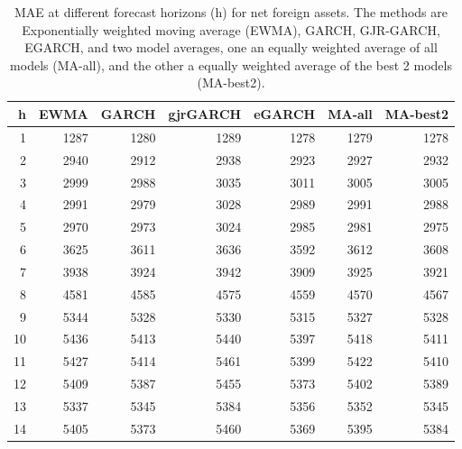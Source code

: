 \begin{table}[ht]
\centering
\begin{tabular}{rrrrrrr}
  \hline
h & EWMA & GARCH & gjrGARCH & eGARCH & MA-all & MA-best2 \\ 
  \hline
1 & 1287 & 1280 & 1289 & 1278 & 1279 & 1278 \\ 
  2 & 2940 & 2912 & 2938 & 2923 & 2927 & 2932 \\ 
  3 & 2999 & 2988 & 3035 & 3011 & 3005 & 3005 \\ 
  4 & 2991 & 2979 & 3028 & 2989 & 2991 & 2988 \\ 
  5 & 2970 & 2973 & 3024 & 2985 & 2981 & 2975 \\ 
  6 & 3625 & 3611 & 3636 & 3592 & 3612 & 3608 \\ 
  7 & 3938 & 3924 & 3942 & 3909 & 3925 & 3921 \\ 
  8 & 4581 & 4585 & 4575 & 4559 & 4570 & 4567 \\ 
  9 & 5344 & 5328 & 5330 & 5315 & 5327 & 5328 \\ 
  10 & 5436 & 5413 & 5440 & 5397 & 5418 & 5411 \\ 
  11 & 5427 & 5414 & 5461 & 5399 & 5422 & 5410 \\ 
  12 & 5409 & 5387 & 5455 & 5373 & 5402 & 5389 \\ 
  13 & 5337 & 5345 & 5384 & 5356 & 5352 & 5345 \\ 
  14 & 5405 & 5373 & 5460 & 5369 & 5395 & 5384 \\ 
   \hline
\end{tabular}
\caption{MAE at different forecast horizons (h) for net foreign assets. The methods are Exponentially weighted moving average (EWMA), GARCH, GJR-GARCH, EGARCH, and two model averages, one an equally weighted average of all models (MA-all), and the other a equally weighted average of the best 2 models (MA-best2).} 
\label{tab:maenfa}
\end{table}



